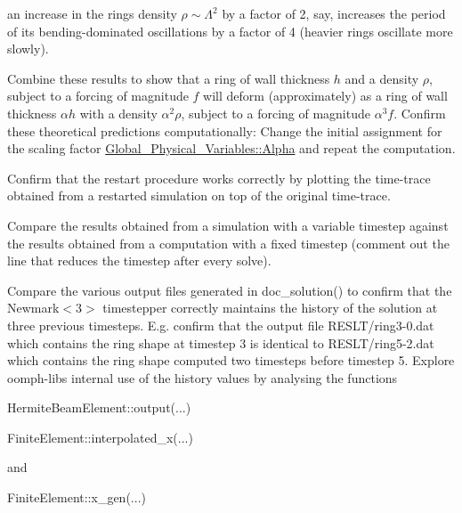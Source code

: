 \begin{DoxyEnumerate}
\begin{DoxyEnumerate}
\begin{DoxyEnumerate}
\end{DoxyEnumerate}
\item an increase in the ring\textquotesingle{}s density $ \rho \sim \Lambda^2$ by a factor of 2, say, increases the period of its bending-\/dominated oscillations by a factor of 4 (heavier rings oscillate more slowly).
\end{DoxyEnumerate}Combine these results to show that a ring of wall thickness $ h $ and a density $ \rho $, subject to a forcing of magnitude $ f $ will deform (approximately) as a ring of wall thickness $ \alpha h $ with a density $ \alpha^2 \rho $, subject to a forcing of magnitude $ \alpha^3 f$. Confirm these theoretical predictions computationally\+: Change the initial assignment for the scaling factor {\ttfamily \hyperlink{namespaceGlobal__Physical__Variables_aa2e802ee7cc8e1ac900ba94c3ce86eb7}{Global\+\_\+\+Physical\+\_\+\+Variables\+::\+Alpha}} and repeat the computation.
\item Confirm that the restart procedure works correctly by plotting the time-\/trace obtained from a restarted simulation on top of the original time-\/trace.
\item Compare the results obtained from a simulation with a variable timestep against the results obtained from a computation with a fixed timestep (comment out the line that reduces the timestep after every solve).
\item Compare the various output files generated in {\ttfamily doc\+\_\+solution()} to confirm that the {\ttfamily Newmark$<$3$>$} timestepper correctly maintains the history of the solution at three previous timesteps. E.\+g. confirm that the output file {\ttfamily R\+E\+S\+L\+T/ring3-\/0.\+dat} which contains the ring shape at timestep 3 is identical to {\ttfamily R\+E\+S\+L\+T/ring5-\/2.\+dat} which contains the ring shape computed two timesteps before timestep 5. Explore {\ttfamily oomph-\/lib\textquotesingle{}s} internal use of the history values by analysing the functions 
\begin{DoxyCode}
HermiteBeamElement::output(...)
\end{DoxyCode}
 
\begin{DoxyCode}
FiniteElement::interpolated\_x(...)
\end{DoxyCode}
 and 
\begin{DoxyCode}
FiniteElement::x\_gen(...)
\end{DoxyCode}

\end{DoxyEnumerate}



